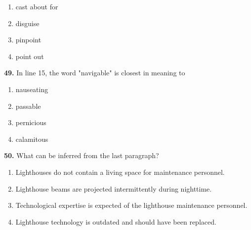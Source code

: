 \documentclass[12pt]{article}
\begin{document}
\begin{enumerate}[label=(\Alph*),leftmargin=*,itemsep=0.2em]
\item cast about for
\item disguise
\item pinpoint
\item point out
\end{enumerate}
\par
\vspace{0.25\baselineskip}
\noindent\textbf{49.} In line 15, the word "navigable" is closest in meaning to
\begin{enumerate}[label=(\Alph*),leftmargin=*,itemsep=0.2em]
\item nauseating
\item passable
\item pernicious
\item calamitous
\end{enumerate}
\par
\vspace{0.25\baselineskip}
\noindent\textbf{50.} What can be inferred from the last paragraph?
\begin{enumerate}[label=(\Alph*),leftmargin=*,itemsep=0.2em]
\item Lighthouses do not contain a living space for maintenance personnel.
\item Lighthouse beams are projected intermittently during nighttime.
\item Technological expertise is expected of the lighthouse maintenance personnel.
\item Lighthouse technology is outdated and should have been replaced.
\end{enumerate}
\par
\vspace{0.25\baselineskip}
\end{document}
